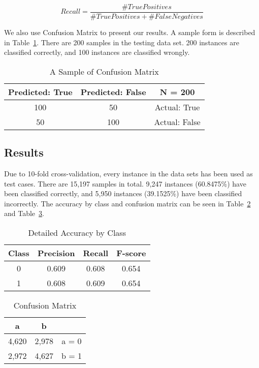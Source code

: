 \begin{equation}
Recall = \frac{\#TruePositives}{\#TruePositives+\#FalseNegatives}
\end{equation}

We also use Confusion Matrix to present our results.
A sample form is described in Table~\ref{table:sample}.
There are 200 samples in the testing data set.
200 instances are classified correctly, and 100 instances are classified wrongly.

\begin{table}
\begin{center}
\begin{tabular}{|c|c|c|}
\hline
Predicted: True & Predicted: False & N = 200 \\ \hline
100 & 50 & Actual: True \\ \hline
50 & 100 & Actual: False \\ \hline
\end{tabular}
\caption{A Sample of Confusion Matrix}
\label{table:sample}
\end{center}
\end{table}

\subsection{Results}
Due to 10-fold cross-validation, every instance in the data sets has been used as test cases.
There are 15,197 samples in total.
9,247 instances (60.8475\%) have been classified correctly, and 5,950 instances (39.1525\%) have been classified incorrectly.
The accuracy by class and confusion matrix can be seen in Table~\ref{table:accuracy} and Table~\ref{table:matrix}.


\begin{table}
\begin{center}
\begin{tabular}{|c|c|c|c|}
\hline
Class & Precision & Recall & F-score \\ \hline
0 & 0.609 & 0.608 & 0.654 \\ \hline
1 & 0.608 & 0.609 & 0.654 \\ \hline
\end{tabular}
\caption{Detailed Accuracy by Class}
\label{table:accuracy}
\end{center}
\end{table}

\begin{table}
\begin{center}
\begin{tabular}{|c|c|c|}
\hline
a & b & \\ \hline
4,620 & 2,978 & a = 0 \\ \hline
2,972 & 4,627 & b = 1 \\ \hline
\end{tabular}
\caption{Confusion Matrix}
\label{table:matrix}
\end{center}
\end{table}

